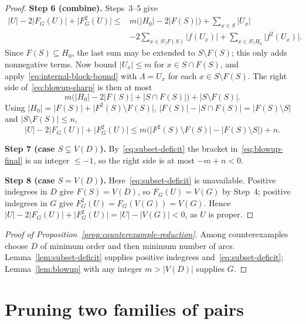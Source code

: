 \documentclass[11pt]{article}
\theoremstyle{remark}
\newcommand{\abs}[1]{\lvert #1\rvert}
\newcommand{\step}[1]{\par\smallskip\noindent\textbf{Step #1.}}
\begin{document}
\begin{proof}
\step{6 (combine)} Steps~3--5 give
\begin{equation}
\label{eq:blowup-sharp}
\begin{aligned}
  \abs{U}-2\abs{F_G(U)}+\abs{F_G^2(U)}
  \le{}& m\bigl(\abs{H_0}-2\abs{F(S)}\bigr)+\sum_{x\in S}\abs{U_x}\\
  &-2\sum_{x\in S\setminus F(S)}\abs{f(U_x)}+\sum_{x\in S\setminus H_0}\abs{f^2(U_x)}.
\end{aligned}
\end{equation}
Since $F(S)\subseteq H_0$, the last sum may be extended to $S\setminus F(S)$;
this only adds nonnegative terms. Now bound $\abs{U_x}\le m$ for
$x\in S\cap F(S)$, and apply~\eqref{eq:internal-block-bound} with
$\Lambda=U_x$ for each $x\in S\setminus F(S)$. The right side
of~\eqref{eq:blowup-sharp} is then at most
\[
 m\bigl(\abs{H_0}-2\abs{F(S)}+\abs{S\cap F(S)}\bigr)+\abs{S\setminus F(S)}.
\]
Using $\abs{H_0}=\abs{F(S)}+\abs{F^2(S)\setminus F(S)}$,
$\abs{F(S)}-\abs{S\cap F(S)}=\abs{F(S)\setminus S}$ and
$\abs{S\setminus F(S)}\le n$,
\begin{equation}\label{eq:blowup-final}
 \abs{U}-2\abs{F_G(U)}+\abs{F_G^2(U)}
 \le m\bigl(\abs{F^2(S)\setminus F(S)}-\abs{F(S)\setminus S}\bigr)+n.
\end{equation}

\step{7 (case $S\subsetneq V(D)$)} By~\eqref{eq:subset-deficit} the bracket
in~\eqref{eq:blowup-final} is an integer $\le-1$, so the right side is at most
$-m+n<0$.

\step{8 (case $S=V(D)$)} Here~\eqref{eq:subset-deficit} is unavailable.
Positive indegrees in $D$ give $F(S)=V(D)$, so $F_G(U)=V(G)$ by Step~4;
positive indegrees in $G$ give $F_G^2(U)=F_G(V(G))=V(G)$. Hence
$\abs{U}-2\abs{F_G(U)}+\abs{F_G^2(U)}=\abs U-\abs{V(G)}<0$, as $U$ is proper.
\end{proof}

\begin{proof}[Proof of Proposition~\ref{prop:counterexample-reduction}]
Among counterexamples choose $D$ of minimum order and then minimum number of
arcs. Lemma~\ref{lem:subset-deficit} supplies positive indegrees
and~\eqref{eq:subset-deficit}; Lemma~\ref{lem:blowup} with any integer
$m>\abs{V(D)}$ supplies $G$.
\end{proof}

\section{Pruning two families of pairs}\label{sec:pruning}
\end{document}
